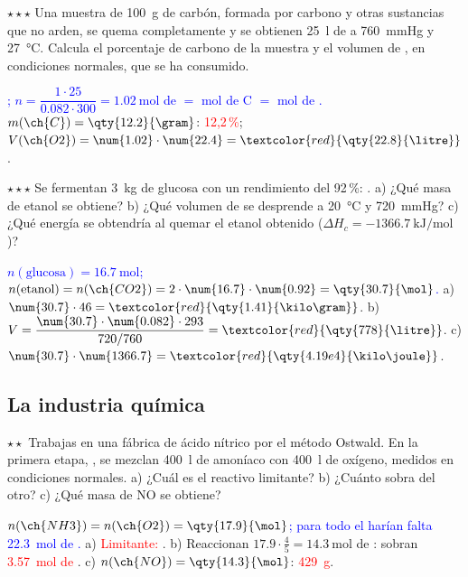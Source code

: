 \begin{exercise}
    \(\star\star\star\) Una muestra de \qty{100}{\gram} de carbón, formada por carbono y otras sustancias que no arden, se quema
    completamente y se obtienen \qty{25}{\litre} de  a \qty{760}{\mmHg} y \qty{27}{\degreeCelsius}. Calcula el porcentaje
    de carbono de la muestra y el volumen de , en condiciones normales, que se ha consumido.
    \begin{solu}
        \textcolor{blue}{; \(n = \dfrac{1 \cdot 25}{\num{0.082} \cdot 300} = \qty{1.02}{\mol}\) de  \(=\) mol de C
        \(=\) mol de .} \(m(\ch{C}) = \qty{12.2}{\gram}\): \textcolor{red}{12,2\,\%}; \(V(\ch{O2}) = \num{1.02} \cdot \num{22.4} =
        \textcolor{red}{\qty{22.8}{\litre}}\).
    \end{solu}
\end{exercise}

\begin{exercise}
    \(\star\star\star\) Se fermentan \qty{3}{\kilo\gram} de glucosa con un rendimiento del 92\,\%:
    . a) ¿Qué masa de etanol se obtiene? b) ¿Qué volumen de  se desprende a
    \qty{20}{\degreeCelsius} y \qty{720}{\mmHg}? c) ¿Qué energía se obtendría al quemar el etanol obtenido
    (\(\Delta H_c = \qty{-1366.7}{\kilo\joule\per\mol}\))?
    \begin{solu}
        \textcolor{blue}{\(n(\text{glucosa}) = \qty{16.7}{\mol}\); \(n(\text{etanol}) = n(\ch{CO2}) = 2 \cdot \num{16.7} \cdot \num{0.92} =
        \qty{30.7}{\mol}\).} a) \(\num{30.7} \cdot 46 = \textcolor{red}{\qty{1.41}{\kilo\gram}}\). b) \(V = \dfrac{\num{30.7} \cdot
        \num{0.082} \cdot 293}{720/760} = \textcolor{red}{\qty{778}{\litre}}\). c) \(\num{30.7} \cdot \num{1366.7} =
        \textcolor{red}{\qty{4.19e4}{\kilo\joule}}\).
    \end{solu}
\end{exercise}

\subsection{La industria química}

\begin{exercise}
    \(\star\star\) Trabajas en una fábrica de ácido nítrico por el método Ostwald. En la primera etapa,
    , se mezclan \qty{400}{\litre} de amoníaco con \qty{400}{\litre} de oxígeno, medidos en
    condiciones normales. a) ¿Cuál es el reactivo limitante? b) ¿Cuánto sobra del otro? c) ¿Qué masa de NO se obtiene?
    \begin{solu}
        \textcolor{blue}{\(n(\ch{NH3}) = n(\ch{O2}) = \qty{17.9}{\mol}\); para todo el  harían falta \qty{22.3}{\mol} de .}
        a) \textcolor{red}{Limitante: }. b) Reaccionan \(\num{17.9} \cdot \frac{4}{5} = \qty{14.3}{\mol}\) de : sobran
        \textcolor{red}{\qty{3.57}{\mol} de }. c) \(n(\ch{NO}) = \qty{14.3}{\mol}\): \textcolor{red}{\qty{429}{\gram}}.
    \end{solu}
\end{exercise}

